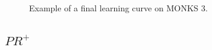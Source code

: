 \begin{appendices}
\begin{figure}[H]
\begin{subfigure}{0.60\textwidth}
{                        }
                        \caption{}
                        \label{fig:monks_3_ACC_CGD_HS}
                    \end{subfigure}
                    \caption{Example of a final learning curve on MONKS 3.}
                    \label{fig:monks_3_CGD_HS}
                \end{figure}


            \subsection{$PR^+$} %
            \label{sub:pr}

                \begin{figure}[H]
                    \centering
                    \begin{subfigure}{0.60\textwidth}
                        \caption{}
                        \label{fig:monks_1_MSE_CGD_PR}
                    \end{subfigure}
                    \begin{subfigure}{0.60\textwidth}
                        \resizebox{\textwidth}{!}{
}
\end{subfigure}
\end{figure}
\end{appendices}
